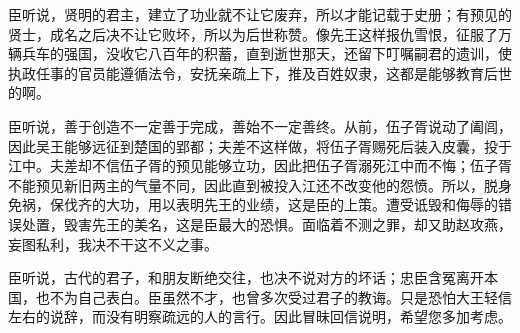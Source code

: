 \documentclass[12pt,UTF-8,openany,a4]{ctexbook}
\begin{document}
\begin{large}
    臣听说，贤明的君主，建立了功业就不让它废弃，所以才能记载于史册；有预见的贤士，成名之后决不让它败坏，所以为后世称赞。像先王这样报仇雪恨，征服了万辆兵车的强国，没收它八百年的积蓄，直到逝世那天，还留下叮嘱嗣君的遗训，使执政任事的官员能遵循法令，安抚亲疏上下，推及百姓奴隶，这都是能够教育后世的啊。
    
    臣听说，善于创造不一定善于完成，善始不一定善终。从前，伍子胥说动了阖闾，因此吴王能够远征到楚国的郢都；夫差不这样做，将伍子胥赐死后装入皮囊，投于江中。夫差却不信伍子胥的预见能够立功，因此把伍子胥溺死江中而不悔；伍子胥不能预见新旧两主的气量不同，因此直到被投入江还不改变他的怨愤。所以，脱身免祸，保伐齐的大功，用以表明先王的业绩，这是臣的上策。遭受诋毁和侮辱的错误处置，毁害先王的美名，这是臣最大的恐惧。面临着不测之罪，却又助赵攻燕，妄图私利，我决不干这不义之事。
    
    臣听说，古代的君子，和朋友断绝交往，也决不说对方的坏话；忠臣含冤离开本国，也不为自己表白。臣虽然不才，也曾多次受过君子的教诲。只是恐怕大王轻信左右的说辞，而没有明察疏远的人的言行。因此冒昧回信说明，希望您多加考虑。
    

\end{large}
\end{document}
